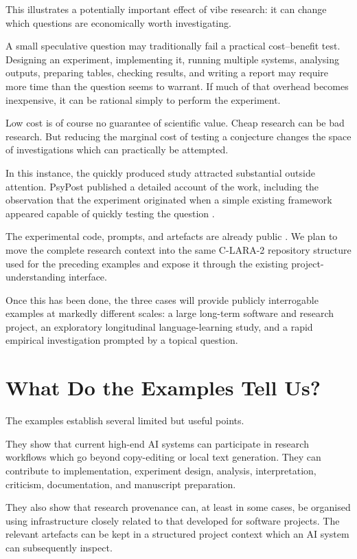 This illustrates a potentially important effect of vibe research: it can change which questions are economically worth investigating.

A small speculative question may traditionally fail a practical cost--benefit test. Designing an experiment, implementing it, running multiple systems, analysing outputs, preparing tables, checking results, and writing a report may require more time than the question seems to warrant. If much of that overhead becomes inexpensive, it can be rational simply to perform the experiment.

Low cost is of course no guarantee of scientific value. Cheap research can be bad research. But reducing the marginal cost of testing a conjecture changes the space of investigations which can practically be attempted.

In this instance, the quickly produced study attracted substantial outside attention. PsyPost published a detailed account of the work, including the observation that the experiment originated when a simple existing framework appeared capable of quickly testing the question \citep{dolan2025grok}.

The experimental code, prompts, and artefacts are already public \citep{raynerChatGPT2025grok}. We plan to move the complete research context into the same C-LARA-2 repository structure used for the preceding examples and expose it through the existing project-understanding interface.

Once this has been done, the three cases will provide publicly interrogable examples at markedly different scales: a large long-term software and research project, an exploratory longitudinal language-learning study, and a rapid empirical investigation prompted by a topical question.


\section{What Do the Examples Tell Us?}

The examples establish several limited but useful points.

They show that current high-end AI systems can participate in research workflows which go beyond copy-editing or local text generation. They can contribute to implementation, experiment design, analysis, interpretation, criticism, documentation, and manuscript preparation.

They also show that research provenance can, at least in some cases, be organised using infrastructure closely related to that developed for software projects. The relevant artefacts can be kept in a structured project context which an AI system can subsequently inspect.

